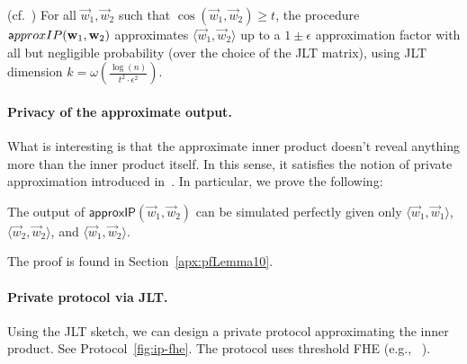 \begin{lemma} {\rm (cf.~\cite[Corollary 3.1]{Kaban15})}
\label{lem:jlt_k}
For all $\vec{w}_1, \vec{w}_2$ such that $\cos(\vec{w}_1, \vec{w}_2)\geq t$, the
procedure ${\sf approxIP}(\vec{w}_1, \vec{w}_2)$ approximates $\langle \vec{w}_1,
\vec{w}_2 \rangle$ up to a $1\pm \epsilon$ approximation factor with all but
negligible probability (over the choice of the JLT matrix), using JLT dimension
$k = \omega\left(\frac{\log(n)}{t^2 \cdot \epsilon^2}\right)$. 
\end{lemma}


\paragraph{Privacy of the approximate output.} What is interesting is that the
approximate inner product doesn't reveal anything more than the inner product
itself. In this sense, it satisfies the notion of private
approximation introduced in~\cite{FIM+06}. In particular, we prove the following:

\begin{lemma}\label{lem:simip}
The output of $\mathsf{approxIP}(\vec{w}_1, \vec{w}_2)$ can be simulated
perfectly given only $\langle \vec{w}_1, \vec{w}_1 \rangle$, $\langle
\vec{w}_2, \vec{w}_2 \rangle$, and $\langle \vec{w}_1, \vec{w}_2 \rangle$.
\end{lemma}

The proof is found in Section~\ref{apx:pfLemma10}. 


\paragraph{Private protocol via JLT.} 
Using the JLT sketch, we can design a private protocol approximating the
inner product. See Protocol~\ref{fig:ip-fhe}. The protocol uses
threshold FHE (e.g., ~\cite{popets:MTBH21}). 

